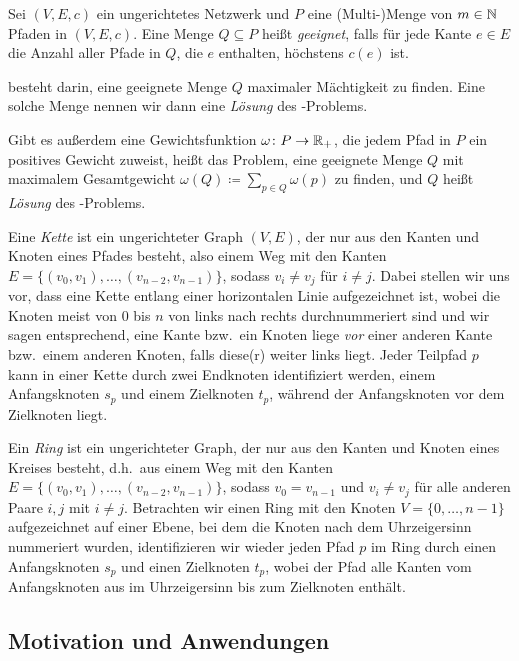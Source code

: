\begin{definition}
    Sei $(V,E,c)$ ein ungerichtetes Netzwerk und $P$ eine (Multi-)Menge von $m \in \mathbb N$ Pfaden in $(V,E,c)$.
    Eine Menge $Q \subseteq P$ heißt {\em geeignet}, falls für jede Kante $e \in E$ die Anzahl aller Pfade in $Q$,
    die $e$ enthalten, höchstens $c(e)$ ist.
    
    {\em \CallControl} besteht darin, eine geeignete Menge $Q$ maximaler Mächtigkeit zu finden.
    Eine solche Menge nennen wir dann eine {\em Lösung} des \CallControl-Problems.
    
    Gibt es außerdem eine Gewichtsfunktion $\omega \colon P \rightarrow \mathbb R_+$, die jedem Pfad in $P$ ein 
    positives Gewicht zuweist, heißt das Problem, eine geeignete Menge $Q$ mit maximalem Gesamtgewicht
    $\omega(Q) \coloneqq \sum_{p \in Q} \omega(p)$ zu finden, {\em \WeightedCallControl} und $Q$ heißt 
    {\em Lösung} des \WeightedCallControl-Problems.
\end{definition}

Eine {\em Kette} ist ein ungerichteter Graph $(V,E)$, der nur aus den Kanten und Knoten eines Pfades besteht, also einem
Weg mit den Kanten $E=\{(v_0, v_1),\dots,(v_{n-2},v_{n-1})\}$, sodass $v_i \neq v_j$ für $i \neq j$.
Dabei stellen wir uns vor, dass eine Kette entlang einer horizontalen Linie aufgezeichnet ist, wobei die
Knoten meist von $0$ bis $n$ von links nach rechts durchnummeriert sind und wir sagen entsprechend, eine Kante bzw.\ ein Knoten 
liege {\em vor} einer anderen Kante bzw.\ einem anderen Knoten, falls diese(r) weiter links liegt.
Jeder Teilpfad $p$ kann in einer Kette durch zwei Endknoten identifiziert werden, einem Anfangsknoten $s_p$ und einem 
Zielknoten $t_p$, während der Anfangsknoten vor dem Zielknoten liegt.

Ein {\em Ring} ist ein ungerichteter Graph, der nur aus den Kanten und Knoten eines Kreises besteht, d.h.\ aus einem Weg 
mit den Kanten $E=\{(v_0, v_1),\dots,(v_{n-2},v_{n-1})\}$, sodass $v_0 = v_{n-1}$ und $v_i \neq v_j$ für alle anderen Paare $i,j$ 
mit $i \neq j$.
Betrachten wir einen Ring mit den Knoten $V=\{0, \dots , n-1\}$ aufgezeichnet auf einer Ebene, bei dem die Knoten nach
dem Uhrzeigersinn nummeriert wurden, identifizieren wir wieder jeden Pfad $p$ im Ring durch einen Anfangsknoten $s_p$ und einen Zielknoten 
$t_p$, wobei der Pfad alle Kanten vom Anfangsknoten aus im Uhrzeigersinn bis zum Zielknoten enthält.


\subsection{Motivation und Anwendungen}\label{subsec:motivationUndAnwendungen}

